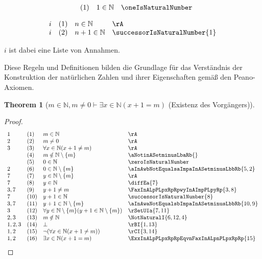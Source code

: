 \documentclass{book}
\theoremstyle{plain}
\newtheorem{theorem}{Theorem}
\theoremstyle{remark}
\theoremstyle{definition}
\begin{document}
\[
\begin{array}{llll}
	& (1) & 1\in\mathbb{N} & \oneIsNaturalNumber \\
\end{array}
\]

\[
\begin{array}{llll}
	i & (1) & n \in \mathbb{N} & \rA \\
	i & (2) & n+1\in\mathbb{N} & \successorIsNaturalNumber{1} \\
\end{array}
\]

\(i\) ist dabei eine Liste von Annahmen.

Diese Regeln und Definitionen bilden die Grundlage für das Verständnis der Konstruktion der natürlichen Zahlen und ihrer Eigenschaften gemäß den Peano-Axiomen.


\label{mInNaturalwmNotEqualsZeroImpExxInNaturalLpxPlusOneEqualsmRp}
\begin{theorem}[\(m\in\mathbb{N}, m\neq 0\vdash\exists x\in\mathbb{N}(x+1=m)\) (Existenz des Vorgängers)]
\end{theorem}
\begin{proof}
	\[
	\begin{array}{llll}
		1  & (1) & m\in\mathbb{N} & \rA\\
		2  & (2) & m\neq 0 & \rA\\
		3  & (3) & \forall x\in\mathbb{N}(x+1\neq m) & \rA \\		
		& (4) & m\notin \mathbb{N}\setminus\{m\} & \aNotinASetminusLbaRb{} \\
		& (5) & 0\in\mathbb{N} & \zeroIsNaturalNumber \\
		2  & (6) & 0\in\mathbb{N}\setminus\{m\} & \aInAwbNotEqualsaImpaInASetminusLbbRb{5,2} \\
		7 & (7) & y\in\mathbb{N}\setminus\{m\} & \rA \\
		7 & (8) & y\in\mathbb{N} & \diffEa{7} \\
  		3,7 & (9) & y+1\neq m & \FaxInALpPLpxRpRpwyInAImpPLpyRp{3,8} \\
		7  & (10) & y+1\in\mathbb{N} & \successorIsNaturalNumber{8}  \\
		3,7 & (11) & y+1\in\mathbb{N}\setminus\{m\} & \aInAwaNotEqualsbImpaInASetminusLbbRb{10,9}  \\
		3 & (12) & \forall y\in\mathbb{N}\setminus\{m\}(y+1\in\mathbb{N}\setminus\{m\})  & \rSetUIa{7,11}  \\
           2,3 & (13) & m\notin\mathbb{N}  & \NotNaturalI{6,12,4}  \\ 
		1,2,3 & (14) & \bot  & \rBI{1,13} \\	
		1,2 & (15) & \neg(\forall x\in\mathbb{N}(x+1\neq m))  & \rCI{3,14} \\	
		1,2 & (16) & \exists x\in\mathbb{N}(x+1= m)  & \ExxInALpPLpxRpRpEqvnFaxInALpnPLpxRpRp{15} \\
	\end{array}
	\]
\end{proof}
\end{document}
